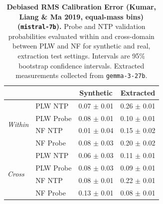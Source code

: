 \begin{table}[ht]
\centering
\begin{tabular}{ll cc}
\toprule
& & Synthetic & Extracted \\
\midrule
\multirow{4}{*}{\textit{Within}}
& PLW NTP & 0.07 $\pm$ 0.01 & 0.26 $\pm$ 0.01 \\
& PLW Probe & 0.08 $\pm$ 0.01 & 0.10 $\pm$ 0.01 \\
& NF NTP & 0.01 $\pm$ 0.04 & 0.15 $\pm$ 0.02 \\
& NF Probe & 0.08 $\pm$ 0.03 & 0.20 $\pm$ 0.02 \\
\midrule
\multirow{4}{*}{\textit{Cross}}
& PLW NTP & 0.06 $\pm$ 0.03 & 0.11 $\pm$ 0.01 \\
& PLW Probe & 0.08 $\pm$ 0.03 & 0.09 $\pm$ 0.01 \\
& NF NTP & 0.08 $\pm$ 0.01 & 0.22 $\pm$ 0.01 \\
& NF Probe & 0.13 $\pm$ 0.01 & 0.08 $\pm$ 0.01 \\
\bottomrule
\end{tabular}
\caption{\textbf{Debiased RMS Calibration Error (Kumar, Liang \& Ma 2019, equal-mass bins) (\texttt{mistral-7b}).} Probe and NTP validation probabilities evaluated within and cross-domain between PLW and NF for synthetic and real, extraction test settings. Intervals are 95\% bootstrap confidence intervals. Extracted measurements collected from \texttt{gemma-3-27b}.}
\label{tab:mistral-7b-gemma-3-27b-pond_nfix-rmsce_db}
\end{table}
